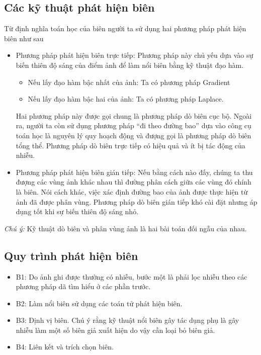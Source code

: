 \documentclass[../report.tex]{subfiles}
\begin{document}
\subsection{Các kỹ thuật phát hiện biên}
Từ định nghĩa toán học của biên người ta sử dụng 
hai phương pháp phát hiện biên như sau
\begin{itemize}
\item Phương pháp phát hiện biên trực tiếp: 
Phương pháp này chủ yếu dựa vào sự biến thiên 
độ sáng của điểm ảnh để làm nổi biên bằng kỹ thuật đạo hàm.
\begin{itemize}
\item Nếu lấy đạo hàm bậc nhất của ảnh: Ta có phương pháp Gradient
\item Nếu lấy đạo hàm bậc hai của ảnh: Ta có phương pháp Laplace. 
\end{itemize}
Hai phương pháp này được gọi chung là phương pháp 
dò biên cục bộ. Ngoài ra, người ta còn sử dụng phương 
pháp “đi theo đường bao” dựa vào công cụ toán học 
là nguyên lý quy hoạch động và đượng gọi là phương 
pháp dò biên tổng thể. Phương pháp dò biên trực tiếp 
có hiệu quả và ít bị tác động của nhiễu.

\item Phương pháp phát hiện biên gián tiếp: 
Nếu bằng cách nào đấy, chúng ta thu đượng các 
vùng ảnh khác nhau thì đường phân cách giữa các 
vùng đó chính là biên. Nói cách khác, 
việc xác định đường bao của ảnh được thực hiện từ ảnh đã được 
phân vùng. Phương pháp dò biên gián tiếp khó cài 
đặt nhưng áp dụng tốt khi sự biến thiên độ sáng nhỏ. 
\end{itemize}
\emph{Chú ý:} Kỹ thuật dò biên và phân vùng ảnh là hai bài 
toán đối ngẫu của nhau. 

\subsection{Quy trình phát hiện biên}
\begin{itemize}
\item B1: Do ảnh ghi được thường có nhiễu, bước một là phải lọc nhiễu theo các phương pháp dã tìm hiểu ở các phần trước.

\item B2: Làm nổi biên sử dụng các toán tử phát hiện biên. 

\item B3: Định vị biên. Chú ý rằng kỹ thuật nổi biên 
    gây tác dụng phụ là gây nhiễu làm một 
    số biên giả xuất hiện do vậy cần loại bỏ biên giả. 
\item B4: Liên kết và trích chọn biên. 
\end{itemize}
\end{document}
